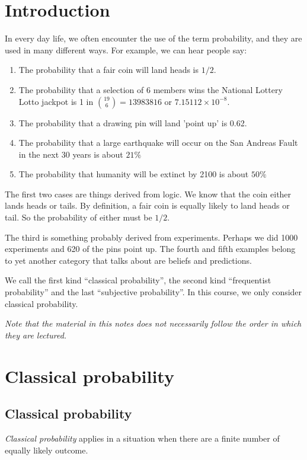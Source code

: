 \documentclass[a4paper]{article}
\begin{document}
\tableofcontents
\setcounter{section}{-1}
\section{Introduction}
In every day life, we often encounter the use of the term probability, and they are used in many different ways. For example, we can hear people say:
\begin{enumerate}
  \item The probability that a fair coin will land heads is $1/2$.
  \item The probability that a selection of 6 members wins the National Lottery Lotto jackpot is 1 in $\binom{19}{6} = 13 983 816$ or $7.15112\times 10^{-8}$.
  \item The probability that a drawing pin will land 'point up' is 0.62.
  \item The probability that a large earthquake will occur on the San Andreas Fault in the next 30 years is about $21\%$
  \item The probability that humanity will be extinct by 2100 is about $50\%$
\end{enumerate}
The first two cases are things derived from logic. We know that the coin either lands heads or tails. By definition, a fair coin is equally likely to land heads or tail. So the probability of either must be $1/2$.

The third is something probably derived from experiments. Perhaps we did 1000 experiments and 620 of the pins point up. The fourth and fifth examples belong to yet another category that talks about are beliefs and predictions.

We call the first kind ``classical probability'', the second kind ``frequentist probability'' and the last ``subjective probability''. In this course, we only consider classical probability.

\emph{Note that the material in this notes does not necessarily follow the order in which they are lectured.}

\section{Classical probability}
\subsection{Classical probability}
\begin{defi}
  \emph{Classical probability} applies in a situation when there are a finite number of equally likely outcome.
\end{defi}
\end{document}
